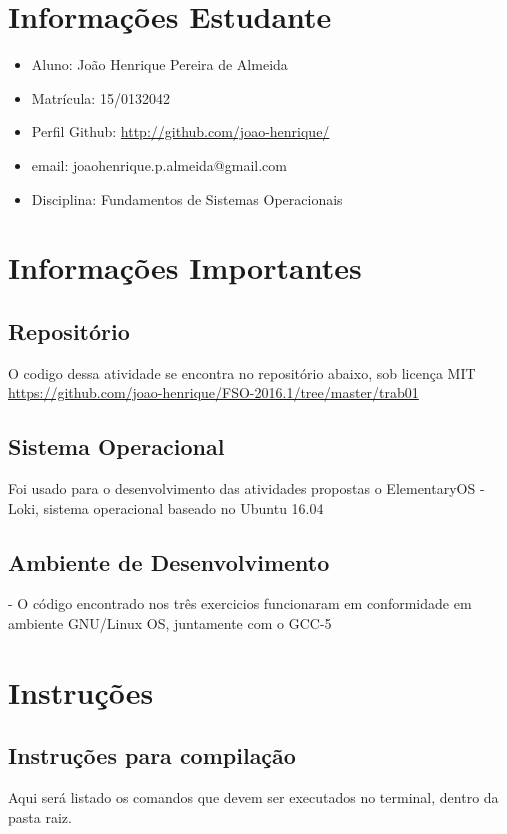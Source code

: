 \documentclass[11pt,a4paper]{article}
\begin{document}
\section{Informações Estudante}
\begin{itemize}
\item Aluno: João Henrique Pereira de Almeida
\item Matrícula: 15/0132042
\item Perfil Github: \href{http://github.com/joao-henrique/}{http://github.com/joao-henrique/}
\item email: joaohenrique.p.almeida@gmail.com
\item Disciplina: Fundamentos de Sistemas Operacionais
\end{itemize}


\section{Informações Importantes}
\subsection{Repositório}
O codigo dessa atividade se encontra no repositório abaixo, sob licença MIT
\url{https://github.com/joao-henrique/FSO-2016.1/tree/master/trab01}
\subsection{Sistema Operacional}

Foi usado para o desenvolvimento das atividades propostas o ElementaryOS - Loki, sistema operacional baseado no Ubuntu 16.04

\subsection{Ambiente de Desenvolvimento }
- O código encontrado nos três exercicios funcionaram em
conformidade em ambiente GNU/Linux OS, juntamente com o GCC-5

\section{Instruções}
\subsection{Instruções para compilação}
Aqui será listado os comandos que devem ser executados no terminal, dentro da pasta raiz.
\end{document}
